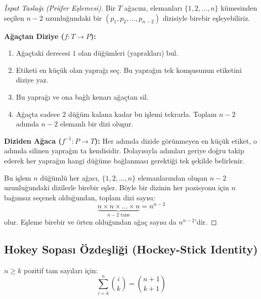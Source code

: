 \begin{proof}[İspat Taslağı (Prüfer Eşlemesi)]
Bir $T$ ağacını, elemanları $\{1, 2, \dots, n\}$ kümesinden seçilen $n-2$ uzunluğundaki bir $(p_1, p_2, \dots, p_{n-2})$ dizisiyle birebir eşleyebiliriz.

\textbf{Ağaçtan Diziye ($f: T \to P$):}
\begin{enumerate}
    \item Ağaçtaki derecesi $1$ olan düğümleri (yaprakları) bul.
    \item Etiketi en küçük olan yaprağı seç. Bu yaprağın tek komşusunun etiketini diziye yaz.
    \item Bu yaprağı ve ona bağlı kenarı ağaçtan sil.
    \item Ağaçta sadece $2$ düğüm kalana kadar bu işlemi tekrarla. Toplam $n-2$ adımda $n-2$ elemanlı bir dizi oluşur.
\end{enumerate}

\textbf{Diziden Ağaca ($f^{-1}: P \to T$):}
Her adımda dizide görünmeyen en küçük etiket, o adımda silinen yaprağın ta kendisidir. Dolayısıyla adımları geriye doğru takip ederek her yaprağın hangi düğüme bağlanması gerektiği tek şekilde belirlenir.

Bu işlem $n$ düğümlü her ağacı, $\{1, 2, \dots, n\}$ elemanlarından oluşan $n-2$ uzunluğundaki dizilerle birebir eşler.
Böyle bir dizinin her pozisyonu için $n$ bağımsız seçenek olduğundan, toplam dizi sayısı:
\[ \underbrace{n \times n \times \dots \times n}_{n-2 \text{ tane}} = n^{n-2} \]
olur. Eşleme birebir ve örten olduğundan ağaç sayısı da $n^{n-2}$'dir.
\end{proof}

\subsection{Hokey Sopası Özdeşliği (Hockey-Stick Identity)}

\begin{theorem}
$n \ge k$ pozitif tam sayıları için:
\[ \sum_{i=k}^{n} \binom{i}{k} = \binom{n+1}{k+1} \]
\end{theorem}

